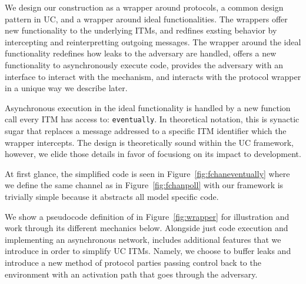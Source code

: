 We design our construction as a wrapper around protocols, a common design pattern in UC, and a wrapper around ideal functionalities.
The wrappers offer new functionality to the underlying ITMs, and redfines exsting behavior by intercepting and reinterpretting outgoing messages.
The wrapper around the ideal functionality redefines how leaks to the adversary are handled, offers a new functionality to asynchronously execute code, provides the adversary with an interface to interact with the mechanism, and interacts with the protocol wrapper in a unique way we describe later.

Asynchronous execution in the ideal functionality is handled by a new function call every ITM has access to: \texttt{eventually}.
In theoretical notation, this is synactic sugar that replaces a message addressed to a specific ITM identifier which the wrapper intercepts.
The design is theoretically sound within the UC framework, however, we elide those details in favor of focusiong on its impact to development.
\begin{figure}

\end{figure}
At first glance, the simplified code is seen in Figure~\ref{fig:fchaneventually} where we define the same channel as in Figure~\ref{fig:fchanpoll} with our framework is trivially simple because it abstracts all model specific code.

We show a pseudocode definition of \fwrapper in Figure~\ref{fig:wrapper} for illustration and work through its different mechanics below. 
Alongside just code execution and implementing an asynchronous network, \fwrapper includes additional features that we introduce in order to simplify UC ITMs.
Namely, we choose to buffer leaks and introduce a new method of protocol parties passing control back to the environment with an activation path that goes through the adversary.


